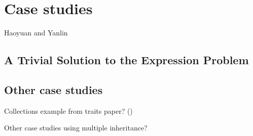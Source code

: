 \section{Case studies}
Haoyuan and Yanlin

\subsection{A Trivial Solution to the Expression Problem}

\subsection{Other case studies}

Collections example from traits paper?
()

Other case studies using multiple inheritance?
